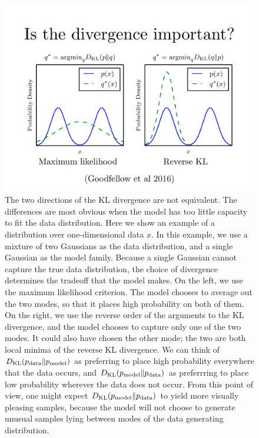   \begin{figure}
    \centering
    \includegraphics[width=\figwidth]{kl}
    \caption{
The two directions of the KL divergence are not equivalent.
The differences are most obvious when the model has too little
capacity to fit the data distribution.
Here we show an example of a distribution over one-dimensional
data $x$.
In this example, we use a mixture of two Gaussians as the data
distribution, and a single Gaussian as the model family.
Because a single Gaussian cannot capture the true data distribution,
the choice of divergence determines the tradeoff that the model makes.
On the left, we use the maximum likelihood criterion.
The model chooses to average out the two modes, so that it places high
probability on both of them.
On the right, we use the reverse order of the arguments to the KL
divergence, and the model chooses to capture only one of the two modes.
It could also have chosen the other mode; the two are both local minima
of the reverse KL divergence.
We can think of $D_{\mathrm{KL}}( p_{\rm{data}} \Vert p_{\rm{model}} )$ as preferring to place
high probability everywhere that the data occurs,
and $D_{\mathrm{KL}}( p_{\rm{model}} \Vert p_{\rm{data}} )$ as preferrring to place low probability
wherever the data does not occur.
From this point of view, one might expect
$D_{\mathrm{KL}}( p_{\rm{model}} \Vert p_{\rm{data}} )$
to yield more visually pleasing samples,
because the model will not choose to generate unusual samples lying
between modes of the data generating distribution.
    }
    \label{fig:kl}
  \end{figure}

